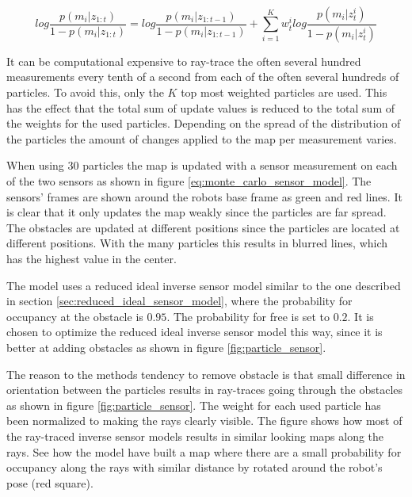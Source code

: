 \begin{equation}
log \frac{p(m_i|z_{1:t})}{1-p(m_i|z_{1:t})} = log \frac{p(m_i|z_{1:t-1})}{1-p(m_i|z_{1:t-1})} + \sum_{i=1}^{K} w_t^i log \frac{ p(m_i | z_t^i) }{ 1 - p(m_i | z_t^i) }
\label{eq:monte_carlo_sensor_model}
\end{equation}

It can be computational expensive to ray-trace the often several hundred measurements every tenth of a second from each of the often several hundreds of particles.
To avoid this, only the $K$ top most weighted particles are used. 
This has the effect that the total sum of update values is reduced to the total sum of the weights for the used particles.
Depending on the spread of the distribution of the particles the amount of changes applied to the map per measurement varies.  

When using 30 particles the map is updated with a sensor measurement on each of the two sensors as shown in figure \vref{eq:monte_carlo_sensor_model}.
The sensors' frames are shown around the robots base frame as green and red lines.
It is clear that it only updates the map weakly since the particles are far spread. 
The obstacles are updated at different positions since the particles are located at different positions. With the many particles this results in blurred lines, which has the highest value in the center.

The model uses a reduced ideal inverse sensor model similar to the one described in section \vref{sec:reduced_ideal_sensor_model}, where the probability for occupancy at the obstacle is $0.95$. The probability for free is set to $0.2$. 
It is chosen to optimize the reduced ideal inverse sensor model this way, since it is better at adding obstacles as shown in figure \vref{fig:particle_sensor}.

The reason to the methods tendency to remove obstacle is that small difference in orientation between the particles results in ray-traces going through the obstacles as shown in figure \vref{fig:particle_sensor}. The weight for each used particle has been normalized to making the rays clearly visible. 
The figure shows how most of the ray-traced inverse sensor models results in similar looking maps along the rays. 
See how the model have built a map where there are a small probability for occupancy along the rays with similar distance by rotated around the robot's pose (red square). 

